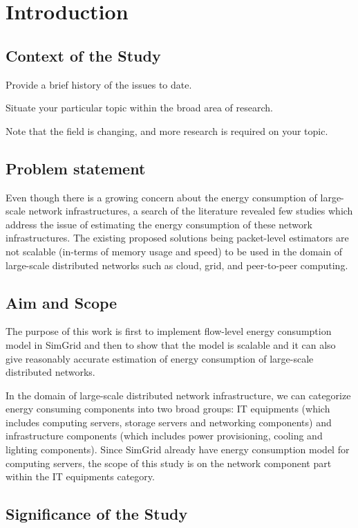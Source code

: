 \chapter{Introduction}
\label{chapter:intro}

\section{Context of the Study}	 
Provide a brief history of the issues to date.

Situate your particular topic within the broad area of research.

Note that the field is changing, and more research is required on your topic.
\section{Problem statement}
Even though there is a growing concern about the energy consumption of large-scale network infrastructures, a search of the literature revealed few studies which address the issue of estimating the energy consumption of these network infrastructures. The existing proposed solutions being packet-level estimators are not scalable (in-terms of memory usage and speed) to be used in the domain of large-scale distributed networks such as cloud, grid, and peer-to-peer computing. 

\section{Aim and Scope}

The purpose of this work is first to implement flow-level energy consumption model in SimGrid and then to show that the model is scalable and it can also give reasonably accurate estimation of energy consumption of large-scale distributed networks.

In the domain of large-scale distributed network infrastructure, we can categorize energy consuming components into two broad groups: IT equipments (which includes computing servers, storage servers and networking components) and infrastructure components (which includes power provisioning, cooling and lighting components). Since SimGrid already have energy consumption model for computing servers, the scope of this study is on the network component part within the IT equipments category.

\section{Significance of the Study}

